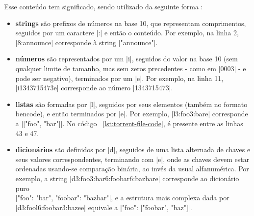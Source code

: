 Esse conteúdo tem significado, sendo utilizado da seguinte forma
\cite{wikitheory:bencoding}:

\begin{itemize}
    \item \textbf{\glspl*{string}} são prefixos de números na base 10, que representam
        comprimentos, seguidos por um caractere \bverb|:| e então o conteúdo. Por
        exemplo, na linha 2, \bverb|8:announce| corresponde à \gls*{string}
        \sverb|"announce"|.

    \item \textbf{números} são representados por um \bverb|i|, seguidos do valor na
        base 10 (sem qualquer limite de tamanho, mas sem zeros precedentes - como em
        \bverb|0003| - e pode ser negativo), terminados por um \bverb|e|. Por exemplo,
        na linha 11, \bverb|i1343715473e| corresponde ao número \sverb|1343715473|.

    \item \textbf{listas} são formadas por \bverb|l|, seguidos por seus elementos
        (também no formato \gls*{bencode}), e então terminados por \bverb|e|. Por
        exemplo, \bverb|l3:foo3:bare| corresponde a \sverb|["foo", "bar"]|. No código
        ~\ref{lst:torrent-file-code}, é presente entre as linhas 43 e 47.

    \item \textbf{dicionários} são definidos por \bverb|d|, seguidos de uma lista
        alternada de chaves e seus valores correspondentes, terminando com \bverb|e|,
        onde as chaves devem estar ordenadas usando-se comparação binária, ao invés da
        usual alfanumérica. Por exemplo, a \gls*{string}
        \bverb|d3:foo3:bar6:foobar6:bazbare| corresponde ao dicionário puro \\
        \sverb|{"foo": "bar", "foobar": "bazbar"}|, e a estrutura mais complexa dada por
        \\ \bverb|d3:fool6:foobar3:bazee| equivale a \sverb|{"foo": ["foobar", "baz"]}|.
\end{itemize}

